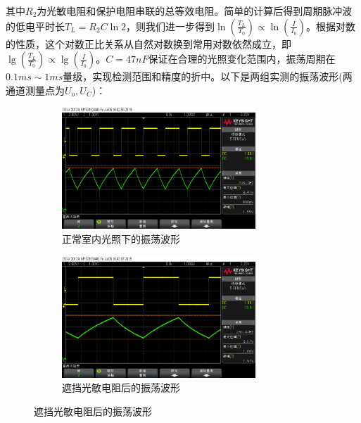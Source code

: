\documentclass[a4paper, 11pt]{article} %
\begin{document}
其中$R_2$为光敏电阻和保护电阻串联的总等效电阻。简单的计算后得到周期脉冲波的低电平时长$T_L = R_2C\ln 2$，则我们进一步得到$\ln(\frac{T_L}{T_0}) \propto \ln(\frac{I}{I_0})$。根据对数的性质，这个对数正比关系从自然对数换到常用对数依然成立，即$\lg(\frac{T_L}{T_0}) \propto \lg(\frac{I}{I_0})$。$C = 47nF$保证在合理的光照变化范围内，振荡周期在$0.1ms \sim 1ms$量级，实现检测范围和精度的折中。以下是两组实测的振荡波形(两通道测量点为$U_o, U_C$)：

\begin{figure}[H]
  \centering
  \begin{minipage}[H]{0.48\textwidth}
    \begin{figure}[H]
      \centering
      \includegraphics[width = 0.8\textwidth]{light_osc.png}
      \caption{正常室内光照下的振荡波形}
    \end{figure}
  \end{minipage}
  \begin{minipage}[H]{0.48\textwidth}
    \begin{figure}[H]
      \centering
      \includegraphics[width = 0.8\textwidth]{dark_osc.png}
      \caption{遮挡光敏电阻后的振荡波形}
    \end{figure}
  \end{minipage}
\end{figure}
\end{document}
